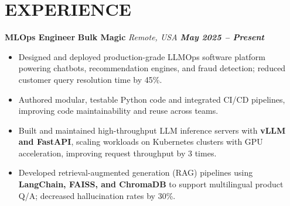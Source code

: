 \documentclass[10pt,letter]{article}
\newcommand{\boldlarger}[1]{\textbf{\normalsize #1}}
\begin{document}




\section*{EXPERIENCE}
\boldlarger{MLOps Engineer} \hfill \boldlarger{Bulk Magic} \hfill \textit{Remote, USA \hspace{4.25em} \boldlarger{May 2025 -- Present}}\\
\vspace{-16pt}
\begin{itemize}

  \item Designed and deployed production-grade LLMOps software platform powering chatbots, recommendation engines, and fraud detection; reduced customer query resolution time by 45\%.

  \item Authored modular, testable Python code and integrated CI/CD pipelines, improving code maintainability and reuse across teams.

  \item Built and maintained high-throughput LLM inference servers with \textbf{vLLM and FastAPI}, scaling workloads on Kubernetes clusters with GPU acceleration, improving request throughput by 3 times.
  
  \item Developed retrieval-augmented generation (RAG) pipelines using \textbf{LangChain, FAISS, and ChromaDB} to support multilingual product Q/A; decreased hallucination rates by 30\%.

\end{itemize}
\vspace{-6pt}
\end{document}
